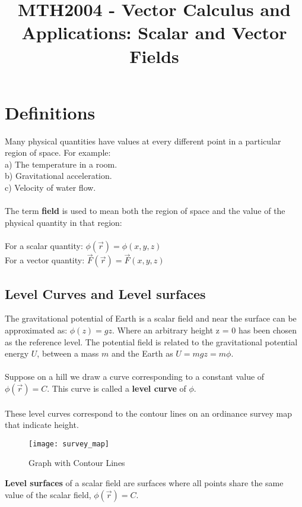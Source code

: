 \documentclass[11pt]{article}
\title{MTH2004 - Vector Calculus and Applications: Scalar and Vector Fields}
\begin{document}
    \maketitle
\section{Definitions}\label{sec:definitions}
    Many physical quantities have values at every different point in a particular
    region of space.
    For example:\\
    \newline
    a) The temperature in a room.\\
    b) Gravitational acceleration.\\
    c) Velocity of water flow.
    \\
    \\
    The term \textbf{field} is used to mean both the region of space and the value of the physical
    quantity in that region:\\\\
    \textbullet \; For a scalar quantity: $\phi(\vec{r}) = \phi(x,y,z)$\\
    \textbullet \; For a vector quantity: $\vec{F}(\vec{r}) = \vec{F}(x,y,z)$\\
    \subsection{Level Curves and Level surfaces}\label{subsec:level-curves-and-level-surfaces}
    The gravitational potential of Earth is a scalar field and near the surface can be approximated as: $\phi(z) = gz$.
    Where an arbitrary height z = 0 has been chosen as the reference level.
    The potential field is related to the gravitational potential energy $U$, between a mass $m$ and the Earth
    as $U = mgz = m\phi$.\\\\
    Suppose on a hill we draw a curve corresponding to a constant value of $\phi(\vec{r}) = C$.
    This curve is called a \textbf{level curve} of $\phi$.\\\\
    These level curves correspond to the contour lines on an ordinance survey map that indicate height.
    \begin{figure}
        \begin{center}
            \label{fig:figure}
            \texttt{[image: survey\_map]}
            \caption{Graph with Contour Lines}
        \end{center}
    \end{figure}
    \textbf{Level surfaces} of a scalar field are surfaces where all points share the same value of the scalar field,
    $\phi(\vec{r}) = C$.\\
\end{document}
